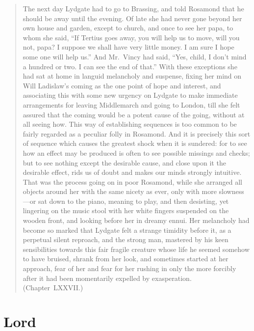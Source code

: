 \documentclass[10pt]{article}
\begin{document}
\begin{quote}
  The next day Lydgate had to go to Brassing, and told Rosamond that he should be away until the evening.
  Of late she had never gone beyond her own house and garden, except to church, and once to see her papa, to whom she said,
  ``If Tertius goes away, you will help us to move, will you not, papa?
  I suppose we shall have very little money.
  I am sure I hope some one will help us.''
  And Mr.\ Vincy had said,
  ``Yes, child, I don't mind a hundred or two.
  I can see the end of that.''
  With these exceptions she had sat at home in languid melancholy and suspense, fixing her mind on Will Ladislaw's coming as the one point of hope and interest, and associating this with some new urgency on Lydgate to make immediate arrangements for leaving Middlemarch and going to London, till she felt assured that the coming would be a potent cause of the going, without at all seeing how.
  This way of establishing sequences is too common to be fairly regarded as a peculiar folly in Rosamond.
  And it is precisely this sort of sequence which causes the greatest shock when it is sundered: for to see how an effect may be produced is often to see possible missings and checks; but to see nothing except the desirable cause, and close upon it the desirable effect, rids us of doubt and makes our minds strongly intuitive.
  That was the process going on in poor Rosamond, while she arranged all objects around her with the same nicety as ever, only with more slowness---or sat down to the piano, meaning to play, and then desisting, yet lingering on the music stool with her white fingers suspended on the wooden front, and looking before her in dreamy ennui.
  Her melancholy had become so marked that Lydgate felt a strange timidity before it, as a perpetual silent reproach, and the strong man, mastered by his keen sensibilities towards this fair fragile creature whose life he seemed somehow to have bruised, shrank from her look, and sometimes started at her approach, fear of her and fear for her rushing in only the more forcibly after it had been momentarily expelled by exasperation.\linebreak
  \mbox{}\hfill\mbox{(Chapter LXXVII.)}
\end{quote}

\newpage

\section{Lord}
\label{sec:lord}
\end{document}
